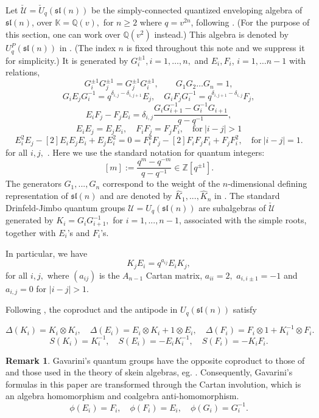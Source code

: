 \documentclass[11pt]{amsart}
\theoremstyle{plain}
\theoremstyle{definition}
\newtheorem{remark}[theorem]{Remark}
\newcommand{\beq}{\begin{equation}}
\newcommand{\eeq}{\end{equation}}
\newcommand{\brem}{\begin{remark}}
\newcommand{\erem}{\end{remark}}
\def\Z{\mathbb Z}
\def\Q{\mathbb Q}
\def\sl{{\mathfrak{sl}}}
\def\ot{{\otimes}}
\def\U{{ {\mathcal U}}}
\def\Uc{{\check {\mathcal U}}}
\def\pmo{{\pm 1}}
\def\K{\mathbb K}
\begin{document}
Let $\Uc=\check U_q(\sl(n))$ be the simply-connected quantized enveloping algebra of $\sl(n)$, over $\K=\Q(v),$ for $n\geq 2$
where $q=v^{2n}$, following \cite{LS}. (For the purpose of this section, one can work over $\Q(v^2)$ instead.)
This algebra is denoted by $U_q^P(\sl(n))$ in \cite{Gavarini2}. 
(The index $n$ is fixed throughout this note and we suppress it for simplicity.)
It is generated by $G_i^{\pm1}, i=1, \dots, n,$ and $E_i, F_i$, $i=1, \dots n-1$ with relations,
$$G_i^{\pm 1}G_j^{\pm 1}=G_j^{\pm 1}G_i^{\pm 1},\qquad G_1 G_2 \dots G_n=1,$$
\beq\label{e.GEF}
G_iE_jG_i^{-1}=q^{\delta_{i,j}-\delta_{i,j+1}}E_j,\quad  G_iF_jG_i^{-1}=q^{\delta_{i,j+1}-\delta_{i,j}}F_j,
\eeq
\beq\label{e.EF}
E_iF_j-F_jE_i=\delta_{i,j}\frac{G_iG_{i+1}^{-1}-  G_i^{-1}G_{i+1}}{q-q^{-1}},
\eeq
$$E_iE_j=E_jE_i,\quad F_i F_j=F_jF_i,\quad \text{for}\ |i-j|>1$$
$$E_i^2E_j-[2] E_iE_jE_i+E_jE_i^2=0=F_i^2F_j-[2] F_iF_jF_i+F_jF_i^2,\quad \text{for}\ |i-j|=1.$$
for all $i,j,$ \cite{Gavarini2}. 
Here we use the standard notation for quantum integers:
$$[m] := \frac{q^m-q^{-m}}{q-q^{-1}}\in \Z[q^\pmo].$$
The generators $G_1,...,G_n$ correspond to the weight of the $n$-dimensional defining representation of $\sl(n)$ and are denoted by $\hat K_1,...,\hat K_n$ in \cite{KS}.
The standard Drinfeld-Jimbo quantum groups $\U=U_q(\sl(n))$ are subalgebras of $\Uc$
generated by $K_i = G_i G_{i+1}^{-1},$ for $i=1,...,n-1$, associated with the simple roots, together with $E_i$'s and $F_i$'s. 

In particular, we have
\beq\label{e.KEF}
K_jE_i=q^{a_{ij}}E_iK_j,
\eeq
for all $i,j,$ where $(a_{ij})$ is the $A_{n-1}$ Cartan matrix, $a_{ii}=2,$ $a_{i,i\pm 1}=-1$ and $a_{i,j}=0$ for  $|i-j|>1.$ 

Following \cite{Kass, KS}, the coproduct and the antipode in $U_q(\sl(n))$ satisfy 

\beq\label{e.copr}
\Delta(K_i)=K_i\ot K_i,\quad \Delta(E_i)=E_i\ot K_i+1\ot E_i,\quad \Delta(F_i)=F_i\ot 1+K_i^{-1}\ot F_i.
\eeq
\beq\label{e.antip}
S(K_i)=K_i^{-1},\quad S(E_i)=-E_i K_i^{-1},\quad S(F_i)=-K_i F_i.
\eeq

\brem\label{r.Gav} Gavarini's quantum groups have the opposite coproduct to those of \cite{Kass,KS} and those used in the theory of skein algebras, eg. \cite{LS}.
Consequently, Gavarini's formulas in this paper are transformed through the Cartan involution, which is an algebra homomorphism and coalgebra anti-homomorphism.  
\beq\label{e.Cartan}
\phi(E_i) = F_i,\quad \phi(F_i) = E_i,\quad \phi(G_i) = G_i^{-1}.
\eeq
\erem
\end{document}
